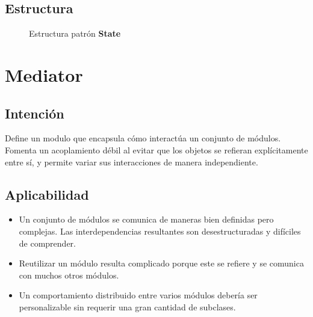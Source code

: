 \subsection*{Estructura}

\begin{figure}[h]
\caption{Estructura patrón \textbf{State}}
\begin{center}
\end{center}
\end{figure}

\section{Mediator}
\label{anexoMediator}

\subsection*{Intención}
Define un modulo que encapsula cómo interactúa un conjunto de módulos. Fomenta un acoplamiento débil al evitar que los objetos se refieran explícitamente entre sí, y permite variar sus interacciones de manera independiente.

\subsection*{Aplicabilidad}
\begin{itemize}
\item Un conjunto de módulos se comunica de maneras bien definidas pero complejas. Las interdependencias resultantes son desestructuradas y difíciles de comprender.

\item Reutilizar un módulo resulta complicado porque este se refiere y se comunica con muchos otros módulos.

\item Un comportamiento distribuido entre varios módulos debería ser personalizable sin requerir una gran cantidad de subclases.
\end{itemize}

